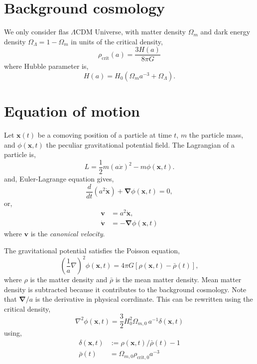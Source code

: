 \documentclass[a4paper]{article}
\begin{document}
\section{Background cosmology}

We only consider flas $\Lambda$CDM Universe, with matter density
$\Omega_m$ and dark energy density $\Omega_\Lambda = 1 - \Omega_m$ in units of the critical density,
\begin{equation}
  \rho_\mathrm{crit}(a) = \frac{3H(a)}{8\pi G}
\end{equation}
where Hubble parameter is,
\begin{equation}
  H(a) = H_0 \left( \Omega_m a^{-3} + \Omega_\Lambda \right).
\end{equation}

\section{Equation of motion}
Let $\bm{x}(t)$ be a comoving position of a particle at time $t$, $m$
the particle mass, and $\phi(\bm{x}, t)$ the peculiar gravitational
potential field. The Lagrangian of a particle is,
\begin{equation}
  L= \frac{1}{2} m (a\dot{x})^2 - m \phi(\bm{x}, t).
\end{equation}
and, Euler-Lagrange equation gives,
\begin{equation}
  \label{eq:motion}
  \frac{d}{dt}(a^2 \dot{\bm{x}}) + \bm{\nabla} \phi(\bm{x}, t) = 0,
\end{equation}
or,
\begin{align}
  \bm{v} &= a^2 \dot{\bm{x}},\\
  \dot{\bm{v}} &= - \bm{\nabla} \phi(\bm{x}, t)
\end{align}
where $\bm{v}$ is the \textit{canonical velocity}. 


The gravitational potential satisfies the Poisson equation,
\begin{equation}
  \left( \frac{1}{a} \nabla \right)^2 \phi(\bm{x}, t)
    = 4\pi G \left[ \rho(\bm{x}, t) - \bar{\rho}(t) \right],
\end{equation}
where $\rho$ is the matter density and $\bar{\rho}$ is the mean matter
density. Mean matter density is subtracted because it contributes to the background cosmology. Note that $\bm{\nabla}/a$ is the derivative in physical
corrdinate. This can be rewritten using the critical density,
\begin{equation}
  \label{eq:poisson2}
  \nabla^2 \phi(\bm{x}, t) =
  \frac{3}{2} H_0^2 \Omega_{m,0} \, a^{-1} \delta(\bm{x}, t)
\end{equation}
using,
\begin{align}
  \delta(\bm{x}, t) &:= \rho(\bm{x}, t)/\bar{\rho}(t) - 1 \\
  \bar{\rho}(t)     &= \Omega_{m,0} \rho_{\mathrm{crit},0} a^{-3}
\end{align}
\end{document}
